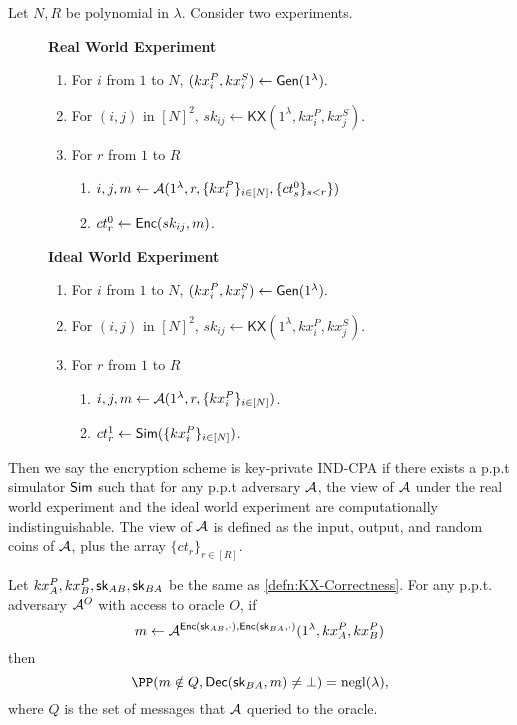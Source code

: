 \begin{definition}
Let $N, R$ be polynomial in $\lambda$. Consider two experiments.
\begin{figure}[h!]
\begin{framed}
\textbf{Real World Experiment}
\begin{enumerate}
    \item For $i$ from $1$ to $N$, $(kx_i^P, kx_i^S) \leftarrow \mathsf{Gen}(1^{\lambda}).$
    \item For $(i, j)$ in $[N]^2$, $sk_{ij} \leftarrow \mathsf{KX}(1^{\lambda}, kx_i^P, kx_j^S)$.
    \item For $r$ from $1$ to $R$
    \begin{enumerate}
        \item $i, j, m \leftarrow \mathcal{A}(1^{\lambda}, r, \{kx_i^P\}_{i \in [N]}, \{ct_{s}^0\}_{s < r}\})$
        \item $ct^{0}_r \leftarrow \mathsf{Enc}(sk_{ij}, m)$.
    \end{enumerate}
\end{enumerate}
\textbf{Ideal World Experiment}
\begin{enumerate}
    \item For $i$ from $1$ to $N$, $(kx_i^P, kx_i^S) \leftarrow \mathsf{Gen}(1^{\lambda}).$
    \item For $(i, j)$ in $[N]^2$, $sk_{ij} \leftarrow \mathsf{KX}(1^{\lambda}, kx_i^P, kx_j^S)$.
    \item For $r$ from $1$ to $R$
    \begin{enumerate}
        \item $i, j, m \leftarrow \mathcal{A}(1^{\lambda}, r, \{kx_i^P\}_{i \in [N]})$.
        \item $ct^1_r \leftarrow \mathsf{Sim}(\{kx_i^P\}_{i \in [N]})$.
    \end{enumerate}
\end{enumerate}
\end{framed}
\end{figure}
Then we say the encryption scheme is key-private IND-CPA if there exists a p.p.t simulator $\mathsf{Sim}$ such that for any p.p.t adversary $\mathcal{A}$, the view of $\mathcal{A}$ under the real world experiment and the ideal world experiment are computationally indistinguishable. The view of $\mathcal{A}$ is defined as the input, output, and random coins of $\mathcal{A}$, plus the array $\{ct_r\}_{r \in [R]}$.
\end{definition}
\begin{definition}
Let $kx^P_A, kx^P_B, {\mathsf{sk}}_{AB}, {\mathsf{sk}}_{BA}$ be the same as \cref{defn:KX-Correctness}. For any p.p.t. adversary $\mathcal{A}^O$ with access to oracle $O$, if
$$m \leftarrow \mathcal{A}^{\mathsf{Enc}({\mathsf{sk}}_{AB}, \cdot), \mathsf{Enc}({\mathsf{sk}}_{BA}, \cdot)}(1^{\lambda}, kx^P_A, kx^P_B)$$
then 
$$\PP(m \notin Q, \Dec(\sk_{BA}, m) \neq \bot) = \negl(\lambda),$$
where $Q$ is the set of messages that $\mathcal{A}$ queried to the oracle.
\end{definition}

